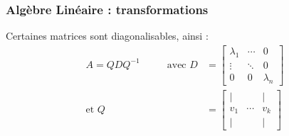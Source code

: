 \documentclass{formation}
\begin{document}
\begin{frame}
  \frametitle{Algèbre Linéaire : transformations}
      Certaines matrices sont diagonalisables, ainsi :
      \begin{align*}
        A = Q D Q^{-1} \hspace{1cm} \mbox{ avec } D & =
        \begin{bmatrix}
          \lambda_1 & \cdots & 0 \\
          \vdots & \ddots & 0 \\
          0 & 0 & \lambda_n
        \end{bmatrix} \\[5mm]
        \mbox{et } Q & =
        \begin{bmatrix}
          \mid && \mid \\
          v_1 & \cdots & v_k \\
          \mid && \mid
        \end{bmatrix}
      \end{align*}
\end{frame}
\end{document}
